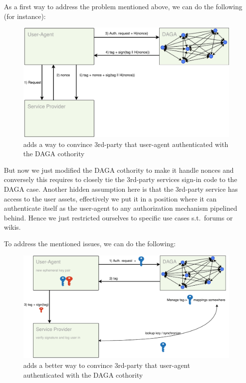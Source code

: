     As a first way to address the problem mentioned above, we can do the following (for instance):
    \begin{figure}
        \includegraphics[width=\linewidth]{images/login1_daga.pdf}
        \caption{adds a way to convince 3rd-party that user-agent authenticated with the DAGA cothority}
        \label{fig:login1}
    \end{figure} %

    But now we just modified the DAGA cothority to make it handle nonces and conversely this requires to closely tie the 3rd-party services
    sign-in code to the DAGA case.
    Another hidden assumption here is that the 3rd-party service has access to the user assets, effectively we put it in a position
    where it can authenticate itself as the user-agent to any authorization mechanism pipelined behind.
    Hence we just restricted ourselves to specific use cases s.t.\ forums or wikis.\newpage

    To address the mentioned issues, we can do the following:
    \begin{figure}
        \includegraphics[width=\linewidth]{images/login2_daga.pdf}
        \caption{adds a better way to convince 3rd-party that user-agent authenticated with the DAGA cothority}
        \label{fig:login2}
    \end{figure}

